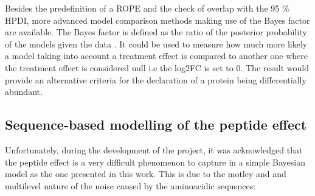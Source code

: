 Besides the predefinition of a \ac{ROPE} and the check of overlap with the 95 \% \ac{HPDI}, more advanced model comparison methods making use of the Bayes factor are available. The Bayes factor is defined as the ratio of the posterior probability of the models given the data \cite{Kruschke}. It could be used to measure how much more likely a model taking into account a treatment effect is compared to another one where the treatment effect is considered null i.e the \ac{log2FC} is set to 0. The result would provide an alternative criteria for the declaration of a protein being differentially abundant.

\subsection{Sequence-based modelling of the peptide effect}

Unfortunately, during the development of the project, it was acknowledged that the peptide effect is a very difficult phenomenon to capture in a simple Bayesian model as the one presented in this work. This is due to the motley and and multilevel nature of the noise caused by the aminoacidic sequences:

